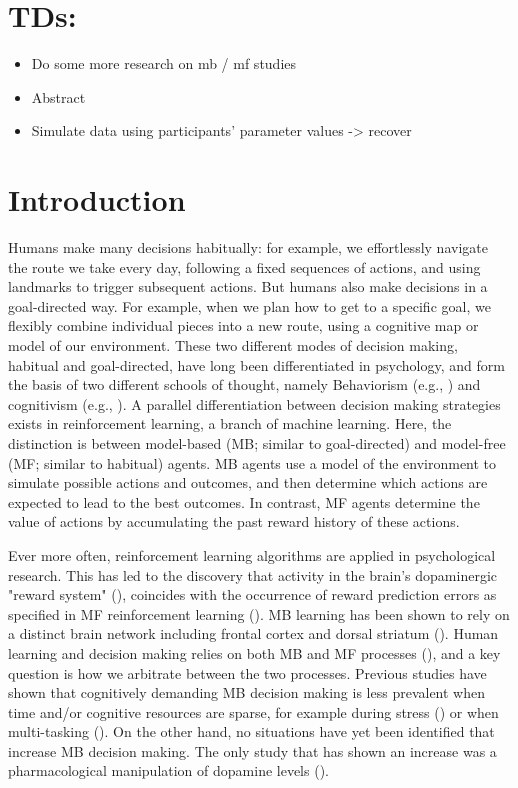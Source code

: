 \documentclass[11pt]{article} %
\begin{document}
\section*{TDs:}
\begin{itemize}
	\item Do some more research on mb / mf studies
	\item Abstract
	\item Simulate data using participants' parameter values -> recover
\end{itemize}

\startmain

\section{Introduction}

Humans make many decisions habitually: for example, we effortlessly navigate the route we take every day, following a fixed sequences of actions, and using landmarks to trigger subsequent actions. But humans also make decisions in a goal-directed way. For example, when we plan how to get to a specific goal, we flexibly combine individual pieces into a new route, using a cognitive map or model of our environment. These two different modes of decision making, habitual and goal-directed, have long been differentiated in psychology, and form the basis of two different schools of thought, namely Behaviorism (e.g., \cite{skinner_why_1977}) and cognitivism (e.g., \cite{tolman_cognitive_1948}). A parallel differentiation between decision making strategies exists in reinforcement learning, a branch of machine learning. Here, the distinction is between model-based (MB; similar to goal-directed) and model-free (MF; similar to habitual) agents. MB agents use a model of the environment to simulate possible actions and outcomes, and then determine which actions are expected to lead to the best outcomes. In contrast, MF agents determine the value of actions by accumulating the past reward history of these actions.

Ever more often, reinforcement learning algorithms are applied in psychological research. This has led to the discovery that activity in the brain's dopaminergic "reward system" (\cite{wise_brain_1989}), coincides with the occurrence of reward prediction errors as specified in MF reinforcement learning (\cite{schultz_neural_1997}). MB learning has been shown to rely on a distinct brain network including frontal cortex and dorsal striatum (\cite{dolan_goals_2013}). Human learning and decision making relies on both MB and MF processes (\cite{daw_model-based_2011}), and a key question is how we arbitrate between the two processes. Previous studies have shown that cognitively demanding MB decision making is less prevalent when time and/or cognitive resources are sparse, for example during stress (\cite{schwabe_stress-induced_2011}) or when multi-tasking (\cite{otto_curse_2013}). On the other hand, no situations have yet been identified that increase MB decision making. The only study that has shown an increase was a pharmacological manipulation of dopamine levels (\cite{wunderlich_dopamine_2012}). 
\end{document}
